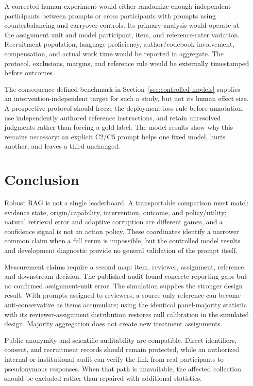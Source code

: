 \documentclass[11pt]{article}
\begin{document}
A corrected human experiment would either randomize enough independent
participants between prompts or cross participants with prompts using
counterbalancing and carryover controls. Its primary analysis would operate at
the assignment unit and model participant, item, and reference-rater
variation. Recruitment population, language proficiency, author/codebook
involvement, compensation, and actual work time would be reported in
aggregate. The protocol, exclusions, margins, and reference rule would be
externally timestamped before outcomes.

The consequence-defined benchmark in Section~\ref{sec:controlled-models}
supplies an intervention-independent target for such a study, but not its
human effect size. A prospective protocol should freeze the deployment-loss
rule before annotation, use independently authored reference instructions,
and retain unresolved judgments rather than forcing a gold label. The model
results show why this remains necessary: an explicit C2/C5 prompt helps one
fixed model, hurts another, and leaves a third unchanged.

\section{Conclusion}

Robust RAG is not a single leaderboard. A transportable comparison must match
evidence state, origin/capability, intervention, outcome, and policy/utility;
natural retrieval error and adaptive corruption are different games, and a
confidence signal is not an action policy. These coordinates identify a
narrower common claim when a full rerun is impossible, but the controlled
model results and development diagnostic provide no general validation of the
prompt itself.

Measurement claims require a second map: item, reviewer, assignment,
reference, and downstream decision. The published audit found concrete
reporting gaps but no confirmed assignment-unit error. The simulation supplies
the stronger design result. With prompts assigned to reviewers, a
source-only reference can become anti-conservative as items accumulate; using
the identical panel-majority statistic with its reviewer-assignment
distribution restores null calibration in the simulated design. Majority
aggregation does not create new treatment assignments.

Public anonymity and scientific auditability are compatible. Direct
identifiers, consent, and recruitment records should remain protected, while
an authorized internal or institutional audit can verify the link from real
participants to pseudonymous responses. When that path is unavailable, the
affected collection should be excluded rather than repaired with additional
statistics.
\end{document}
